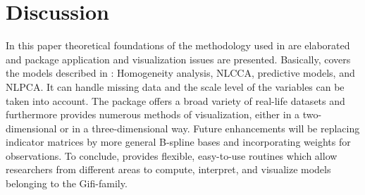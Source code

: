 \documentclass[article]{Z}
\begin{document}
\section{Discussion}
In this paper theoretical foundations of the methodology used in  are elaborated and package application and visualization issues are presented. Basically,  covers the models described in \citet{Gifi:90}: Homogeneity analysis, NLCCA, predictive models, and NLPCA. It can handle missing data and the scale level of the variables can be taken into account. The package offers a broad variety of real-life datasets and furthermore provides numerous methods of visualization, either in a two-dimensional or in a three-dimensional way. Future enhancements will be replacing indicator matrices by more general B-spline bases and incorporating weights for observations. To conclude,  provides flexible, easy-to-use routines which allow researchers from different areas to compute, interpret, and visualize models belonging to the Gifi-family. 






\end{document}

